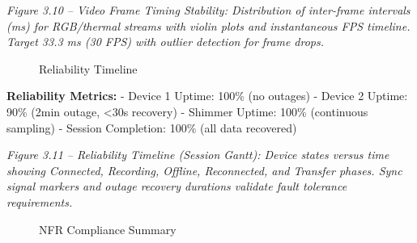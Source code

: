 \documentclass[12pt,a4paper]{article}
\begin{document}
\emph{Figure 3.10 -- Video Frame Timing Stability: Distribution of inter-frame intervals (ms) for RGB/thermal streams with violin plots and instantaneous FPS timeline. Target 33.3 ms (30 FPS) with outlier detection for frame drops.}

\begin{figure}
\centering
{}
\caption{Reliability Timeline}
\end{figure}

\textbf{Reliability Metrics:} - Device 1 Uptime: 100\% (no outages) - Device 2 Uptime: 90\% (2min outage, \textless30s recovery) - Shimmer Uptime: 100\% (continuous sampling) - Session Completion: 100\% (all data recovered)

\emph{Figure 3.11 -- Reliability Timeline (Session Gantt): Device states versus time showing Connected, Recording, Offline, Reconnected, and Transfer phases. Sync signal markers and outage recovery durations validate fault tolerance requirements.}

\begin{figure}
\centering
{}
\caption{NFR Compliance Summary}
\end{figure}
\end{document}
